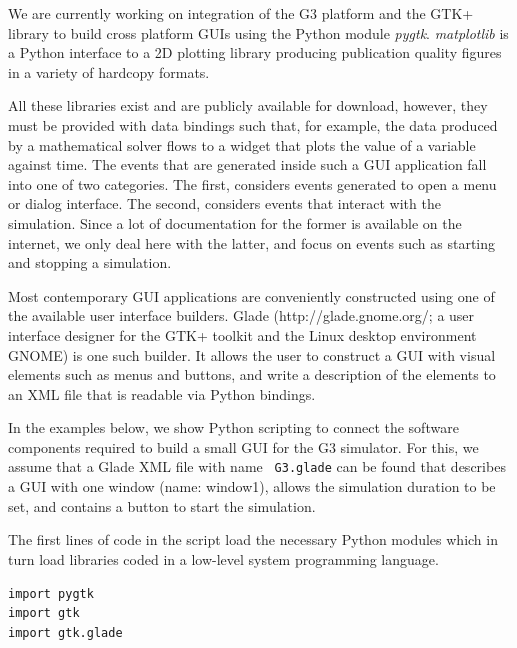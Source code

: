 \documentclass[12pt]{article}
\begin{document}
We are currently working on integration of the G3 platform and the
GTK+ library to build cross platform GUIs using the Python module {\it
  pygtk}.  {\it matplotlib} is a Python interface to a 2D plotting
library producing publication quality figures in a variety of hardcopy
formats.

All these libraries exist and are publicly available for download,
however, they must be provided with data bindings such that, for
example, the data produced by a mathematical solver flows to a widget
that plots the value of a variable against time.  The events that are
generated inside such a GUI application fall into one of two
categories.  The first, considers events generated to open a menu or
dialog interface.  The second, considers events that interact with the
simulation.  Since a lot of documentation for the former is available
on the internet, we only deal here with the latter, and focus on
events such as starting and stopping a simulation.

Most contemporary GUI applications are conveniently constructed using
one of the available user interface builders.  Glade
(http://glade.gnome.org/; a user interface designer for the GTK+
toolkit and the Linux desktop environment GNOME) is one such builder.
It allows the user to construct a GUI with visual elements such as
menus and buttons, and write a description of the elements to an XML
file that is readable via Python bindings.



In the examples below, we show Python scripting to connect the
software components required to build a small GUI for the G3
simulator.  For this, we assume that a Glade XML file with name {\tt
  G3.glade} can be found that describes a GUI with one window (name:
window1), allows the simulation duration to be set, and contains a
button to start the simulation.

The first lines of code in the script load the necessary Python
modules which in turn load libraries coded in a low-level system
programming language.

{\footnotesize
  \resetlinenumber
  \linenumbers
\begin{verbatim}
import pygtk
import gtk
import gtk.glade
\end{verbatim}
}
\end{document}

